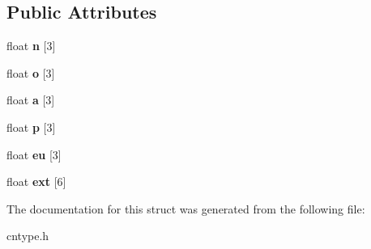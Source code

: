 \subsection*{Public Attributes}
\begin{DoxyCompactItemize}
\item 
\hypertarget{structcn__trans_a920f6866c0dce7bf757d0407bf34cea1}{float {\bfseries n} \mbox{[}3\mbox{]}}\label{structcn__trans_a920f6866c0dce7bf757d0407bf34cea1}

\item 
\hypertarget{structcn__trans_aca4c310fdb527c51acbeb1bdcab5a0c9}{float {\bfseries o} \mbox{[}3\mbox{]}}\label{structcn__trans_aca4c310fdb527c51acbeb1bdcab5a0c9}

\item 
\hypertarget{structcn__trans_a65deac3f3845c844ce1c8b199f419e44}{float {\bfseries a} \mbox{[}3\mbox{]}}\label{structcn__trans_a65deac3f3845c844ce1c8b199f419e44}

\item 
\hypertarget{structcn__trans_adab5b011307b1be3bc1d04e5631e5507}{float {\bfseries p} \mbox{[}3\mbox{]}}\label{structcn__trans_adab5b011307b1be3bc1d04e5631e5507}

\item 
\hypertarget{structcn__trans_a7299e3dedc3a520e751854fab753112b}{float {\bfseries eu} \mbox{[}3\mbox{]}}\label{structcn__trans_a7299e3dedc3a520e751854fab753112b}

\item 
\hypertarget{structcn__trans_a13b87d36f3637f9352b4531f1a09272f}{float {\bfseries ext} \mbox{[}6\mbox{]}}\label{structcn__trans_a13b87d36f3637f9352b4531f1a09272f}

\end{DoxyCompactItemize}


The documentation for this struct was generated from the following file\-:\begin{DoxyCompactItemize}
\item 
cntype.\-h\end{DoxyCompactItemize}
